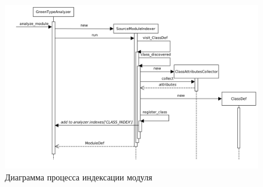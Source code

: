 \begin{description}
  \begin{figure}
  \begin{center}
      \includegraphics[width=\textwidth]{fig/indexing-diag.png}
  \end{center}
  \caption{Диаграмма процесса индексации модуля}
  \label{fig:indexing-diag}
  \end{figure}


\end{description}
